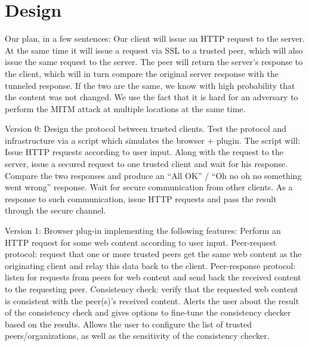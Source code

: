 \section{Design}
\label{sec:design}

Our plan, in a few sentences:
Our client will issue an HTTP request to the server. At the same time it will issue a request via SSL to a trusted peer, which will also issue the same request to the server. The peer will return the server’s response to the client, which will in turn compare the original server response with the tunneled response. If the two are the same, we know with high probability that the content was not changed. We use the fact that it is hard for an adversary to perform the MITM attack at multiple locations at the same time.

Version 0:
Design the protocol between trusted clients.
Test the protocol and infrastructure via a script which simulates the browser + plugin. The script will:
Issue HTTP requests according to user input. Along with the request to the server, issue a secured request to one trusted client and wait for his response. Compare the two responses and produce an “All OK” / “Oh no oh no something went wrong” response.
Wait for secure communication from other clients. As a response to such communication, issue HTTP requests and pass the result through the secure channel.

Version 1:
Browser plug-in implementing the following features:
Perform an HTTP request for some web content according to user input.
Peer-request protocol: request that one or more trusted peers get the same web content as the originating client and relay this data back to the client.
Peer-response protocol: listen for requests from peers for web content and send back the received content to the requesting peer.
Consistency check: verify that the requested web content is consistent with the peer(s)’s received content.
Alerts the user about the result of the consistency check and gives options to fine-tune the consistency checker based on the results.
Allows the user to configure the list of trusted peers/organizations, as well as the sensitivity of the consistency checker.


